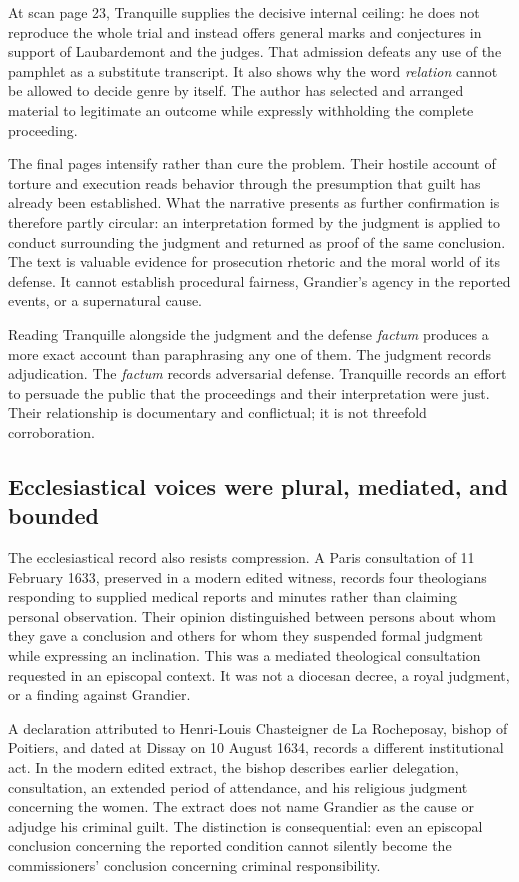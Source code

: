 At scan page 23, Tranquille supplies the decisive internal ceiling: he does
not reproduce the whole trial and instead offers general marks and conjectures
in support of Laubardemont and the judges.  That admission defeats any use of
the pamphlet as a substitute transcript.  It also shows why the word
\emph{relation} cannot be allowed to decide genre by itself.  The author has
selected and arranged material to legitimate an outcome while expressly
withholding the complete proceeding.

The final pages intensify rather than cure the problem.  Their hostile account
of torture and execution reads behavior through the presumption that guilt has
already been established.  What the narrative presents as further
confirmation is therefore partly circular: an interpretation formed by the
judgment is applied to conduct surrounding the judgment and returned as proof
of the same conclusion.  The text is valuable evidence for prosecution
rhetoric and the moral world of its defense.  It cannot establish procedural
fairness, Grandier's agency in the reported events, or a supernatural cause.

Reading Tranquille alongside the judgment and the defense \emph{factum}
produces a more exact account than paraphrasing any one of them.  The judgment
records adjudication.  The \emph{factum} records adversarial defense.
Tranquille records an effort to persuade the public that the proceedings and
their interpretation were just.  Their relationship is documentary and
conflictual; it is not threefold corroboration.

\subsection{Ecclesiastical voices were plural, mediated, and bounded}

The ecclesiastical record also resists compression.  A Paris consultation of
11 February 1633, preserved in a modern edited witness, records four
theologians responding to supplied medical reports and minutes rather than
claiming personal observation.  Their opinion distinguished between persons
about whom they gave a conclusion and others for whom they suspended formal
judgment while expressing an inclination.  This was a mediated theological
consultation requested in an episcopal context.  It was not a diocesan decree,
a royal judgment, or a finding against Grandier.

A declaration attributed to Henri-Louis Chasteigner de La Rocheposay, bishop
of Poitiers, and dated at Dissay on 10 August 1634, records a different
institutional act.  In the modern edited extract, the bishop describes earlier
delegation, consultation, an extended period of attendance, and his religious
judgment concerning the women.  The extract does not name Grandier as the
cause or adjudge his criminal guilt.  The distinction is consequential: even
an episcopal conclusion concerning the reported condition cannot silently
become the commissioners' conclusion concerning criminal responsibility.

